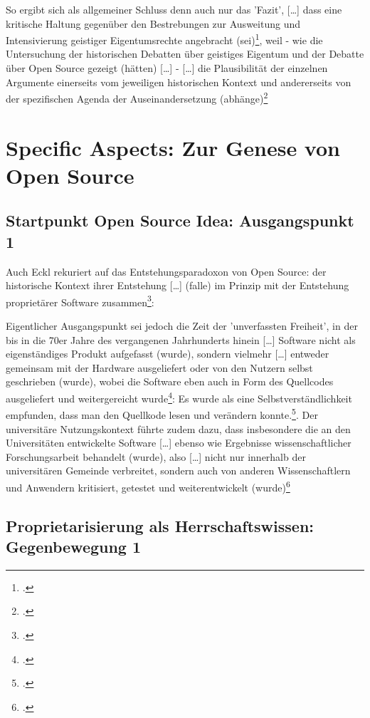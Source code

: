 \documentclass[DIV=calc,BCOR=5mm,11pt,headings=small,oneside,abstract=true, toc=bib]{scrartcl}
\begin{document}
So ergibt sich als allgemeiner Schluss denn auch nur das 'Fazit',
\glqq{}[\ldots] dass eine kritische Haltung gegenüber den Bestrebungen
zur Ausweitung und Intensivierung geistiger Eigentumsrechte angebracht
(sei)\grqq{}\footcite[vgl.][139]{Eckl2004a}, weil - wie \glqq{}die
Untersuchung der historischen Debatten über geistiges Eigentum und der
Debatte über Open Source gezeigt (hätten) [\ldots]\grqq{} - \glqq{}[\ldots]
die Plausibilität der einzelnen Argumente einerseits vom jeweiligen
historischen Kontext und andererseits von der spezifischen Agenda der
Auseinandersetzung (abhänge)\grqq{}\footcite[vgl.][140]{Eckl2004a}

\section{Specific Aspects: Zur Genese von Open Source}

\subsection{Startpunkt Open Source Idea: Ausgangspunkt 1}

Auch Eckl rekuriert auf das Entstehungsparadoxon von Open Source: der
\glqq{}historische Kontext ihrer Entstehung [\ldots] (falle) im Prinzip
mit der Entstehung proprietärer Software
zusammen\grqq{}\footcite[vgl.][102]{Eckl2004a}:

Eigentlicher Ausgangspunkt sei jedoch die Zeit der 'unverfassten Freiheit', in
der \glqq{}bis in die 70er Jahre des vergangenen Jahrhunderts hinein [\ldots]
Software nicht als eigenständiges Produkt aufgefasst (wurde)\grqq{}, sondern
vielmehr \glqq{}[\ldots] entweder gemeinsam mit der Hardware ausgeliefert oder
von den Nutzern selbst geschrieben (wurde)\grqq{}, wobei die Software eben auch
in Form des \glqq{}Quellcodes\grqq{} ausgeliefert und weitergereicht
wurde\footcite[vgl.][102]{Eckl2004a}: \glqq{}Es wurde als eine
Selbstverständlichkeit empfunden, dass man den Quellkode lesen und verändern
konnte.\grqq{}\footcite[][102]{Eckl2004a}. Der universitäre Nutzungskontext
führte zudem dazu, dass \glqq{}insbesondere die an den Universitäten
entwickelte Software [\ldots] ebenso wie Ergebnisse wissenschaftlicher
Forschungsarbeit behandelt (wurde)\grqq{}, also \glqq{}[\ldots] nicht nur
innerhalb der universitären Gemeinde verbreitet, sondern auch von
anderen Wissenschaftlern und Anwendern kritisiert, getestet und
weiterentwickelt (wurde)\grqq{}\footcite[vgl.][102]{Eckl2004a}

\subsection{Proprietarisierung als Herrschaftswissen: Gegenbewegung 1}
\end{document}
